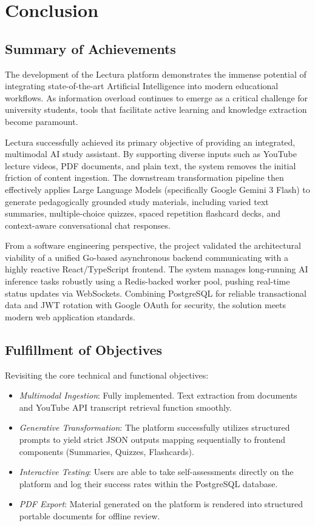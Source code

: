\chapter*{Conclusion}

\section*{Summary of Achievements}
The development of the Lectura platform demonstrates the immense potential of integrating state-of-the-art Artificial Intelligence into modern educational workflows. As information overload continues to emerge as a critical challenge for university students, tools that facilitate active learning and knowledge extraction become paramount. 

Lectura successfully achieved its primary objective of providing an integrated, multimodal AI study assistant. By supporting diverse inputs such as YouTube lecture videos, PDF documents, and plain text, the system removes the initial friction of content ingestion. The downstream transformation pipeline then effectively applies Large Language Models (specifically Google Gemini 3 Flash) to generate pedagogically grounded study materials, including varied text summaries, multiple-choice quizzes, spaced repetition flashcard decks, and context-aware conversational chat responses.

From a software engineering perspective, the project validated the architectural viability of a unified Go-based asynchronous backend communicating with a highly reactive React/TypeScript frontend. The system manages long-running AI inference tasks robustly using a Redis-backed worker pool, pushing real-time status updates via WebSockets. Combining PostgreSQL for reliable transactional data and JWT rotation with Google OAuth for security, the solution meets modern web application standards.

\section*{Fulfillment of Objectives}
Revisiting the core technical and functional objectives:
\begin{itemize}[label=\textendash]
    \item \textit{Multimodal Ingestion}: Fully implemented. Text extraction from documents and YouTube API transcript retrieval function smoothly.
    \item \textit{Generative Transformation}: The platform successfully utilizes structured prompts to yield strict JSON outputs mapping sequentially to frontend components (Summaries, Quizzes, Flashcards).
    \item \textit{Interactive Testing}: Users are able to take self-assessments directly on the platform and log their success rates within the PostgreSQL database.
    \item \textit{PDF Export}: Material generated on the platform is rendered into structured portable documents for offline review.
\end{itemize}

